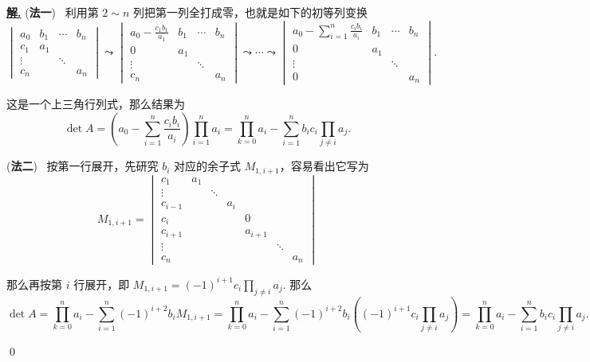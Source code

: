 \documentclass[10pt,openany]{article}
\theoremstyle{thmstyle} %
\theoremstyle{defstyle} %
\theoremstyle{prostyle} %
\theoremstyle{exastyle}
\theoremstyle{remstyle}
\newenvironment{solution}{\par\underline{\textbf{解.}} \;\fangsong}{\qed\par}
\begin{document}
\begin{solution} 
	(\textbf{法一}) \ 利用第 \( 2 \sim n \) 列把第一列全打成零，也就是如下的初等列变换
	\[ \begin{vmatrix}
		a_0 & b_1 & \cdots & b_n \\
		c_1 & a_1 &  & \\
		\vdots &  & \ddots & \\
		c_n &       &        & a_n
	\end{vmatrix} \leadsto \begin{vmatrix}
	a_0-\frac{c_1b_1}{a_1} & b_1 & \cdots & b_n \\
	0 & a_1 &  & \\
	\vdots &  & \ddots & \\
	c_n &       &        & a_n
	\end{vmatrix} \leadsto \cdots \leadsto \begin{vmatrix}
	a_0- \sum_{i=1}^{n}\frac{c_ib_i}{a_i} & b_1 & \cdots & b_n \\
	0 & a_1 &  & \\
	\vdots &  & \ddots & \\
	0 &       &        & a_n
	\end{vmatrix}. \]
	
	这是一个上三角行列式，那么结果为 
	\[ \det A= \left( a_0- \sum_{i=1}^{n}\frac{c_ib_i}{a_i} \right) \prod_{i=1}^{n} a_i=\prod_{k=0}^{n} a_i-\sum_{i=1}^{n} b_ic_i \prod_{j \neq i}^{} a_j.\]
	
	(\textbf{法二}) \ 按第一行展开，先研究 \( b_i \) 对应的余子式 \( M_{1,i+1} \)，容易看出它写为
	\[ M_{1,i+1}= \begin{vmatrix}
		c_1 & a_1 & & & & & \\
		\vdots & & \ddots & & & & \\
		c_{i-1} & &  & a_i & & & \\
		c_{i} & & &  &0  & & \\
		c_{i+1} & & &  & a_{i+1}  & & \\
		\vdots & & & &  & \ddots  & \\
		c_n & & & &  &  & a_n
	\end{vmatrix}\]
	
	那么再按第 \( i \) 行展开，即 \( M_{1,i+1}=(-1)^{i+1} c_i \prod_{j \neq i}^{} a_j \). 那么
	\[ \det A= \prod_{k=0}^{n} a_i- \sum_{i=1}^{n} (-1)^{i+2} b_i M_{1,i+1}= \prod_{k=0}^{n} a_i- \sum_{i=1}^{n} (-1)^{i+2} b_i \left( (-1)^{i+1} c_i \prod_{j \neq i}^{} a_j \right)= \prod_{k=0}^{n} a_i-\sum_{i=1}^{n} b_ic_i \prod_{j \neq i}^{} a_j. \]
	
\end{solution}
\end{document}
